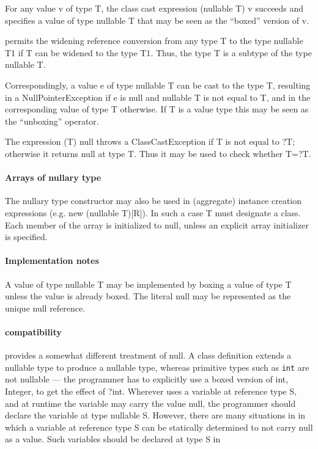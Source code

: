 For any value {\cf v} of type {\cf T}, the class cast expression {\cf
(nullable T) v} succeeds and specifies a value of type {\cf nullable T} that may be
seen as the ``boxed'' version of {\cf v}.

\Xten{} permits the widening reference conversion from any type {\cf T}
to the type {\cf nullable T1} if {\cf T} can be widened to the type {\cf
T1}. Thus, the type {\cf T} is a subtype of the type {\cf nullable T}.

Correspondingly, a value {\cf e} of type {\cf nullable T} can be cast to the
type {\cf T}, resulting in a {\cf NullPointerException} if {\cf e} is
{\cf null} and {\cf nullable T} is not equal to {\cf T}, and in the
corresponding value of type {\cf T} otherwise.  If {\cf T} is a value
type this may be seen as the ``unboxing'' operator.

The expression {\cf (T) null} throws a {\cf ClassCastException} if {\cf
T} is not equal to {\cf ?T}; otherwise it returns {\cf null} at type
{\cf T}. Thus it may be used to check whether {\cf T=?T}.

\paragraph{Arrays of nullary type}
The nullary type constructor may also be used in (aggregate) instance
creation expressions (e.g.{} {\cf new (nullable T)[R]}). In such a
case {\cf T} must designate a class. Each member of the array is
initialized to {\cf null}, unless an explicit array initializer is
specified.

\paragraph{Implementation notes}
A value of type {\cf nullable T} may be implemented by boxing a value of
type {\cf T} unless the value is already boxed. The literal {\cf null}
may be represented as the unique null reference.

\paragraph{\Java{} compatibility}

\java{} provides a somewhat different treatment of {\cf null}.  A
class definition extends a nullable type to produce a nullable type,
whereas primitive types such as {\tt int} are not nullable --- the
programmer has to explicitly use a boxed version of {\cf int}, {\cf
Integer}, to get the effect of {\cf ?int}. Wherever \Java{} uses a
variable at reference type {\cf S}, and at runtime the variable may
carry the value {\cf null}, the \Xten{} programmer should declare the
variable at type {\cf nullable S}. However, there are many situations
in \java{} in which a variable at reference type {\cf S} can be
statically determined to not carry null as a value. Such variables
should be declared at type {\cf S} in \Xten{}

